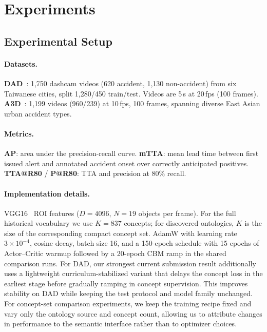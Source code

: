 \section{Experiments}
\label{sec:experiments}

\subsection{Experimental Setup}

\paragraph{Datasets.}
\textbf{DAD}~\citep{ref4}: 1,750 dashcam videos (620 accident,
1,130 non-accident) from six Taiwanese cities, split 1,280/450
train/test. Videos are 5\,s at 20\,fps (100 frames).
\textbf{A3D}~\citep{liao2024crash}: 1,199 videos (960/239) at 10\,fps,
100 frames, spanning diverse East Asian urban accident types.

\paragraph{Metrics.}
\textbf{AP}: area under the precision-recall curve.
\textbf{mTTA}: mean lead time between first issued alert and annotated
accident onset over correctly anticipated positives.
\textbf{TTA@R80} / \textbf{P@R80}: TTA and precision at 80\% recall.

\paragraph{Implementation details.}
VGG16~\citep{ref31} ROI features ($D{=}4096$, $N{=}19$ objects per frame).
For the full historical vocabulary we use $K{=}837$ concepts; for discovered
ontologies, $K$ is the size of the corresponding compact concept set.
AdamW with learning rate $3{\times}10^{-4}$, cosine decay, batch size 16,
and a 150-epoch schedule with 15 epochs of Actor--Critic warmup followed by a
20-epoch CBM ramp in the shared comparison runs. For DAD, our strongest current
submission result additionally uses a lightweight curriculum-stabilized variant
that delays the concept loss in the earliest stage before gradually ramping in
concept supervision. This improves stability on DAD while keeping the test
protocol and model family unchanged. For concept-set comparison experiments, we
keep the training recipe fixed and vary only the ontology source and concept
count, allowing us to attribute changes in performance to the semantic
interface rather than to optimizer choices.

